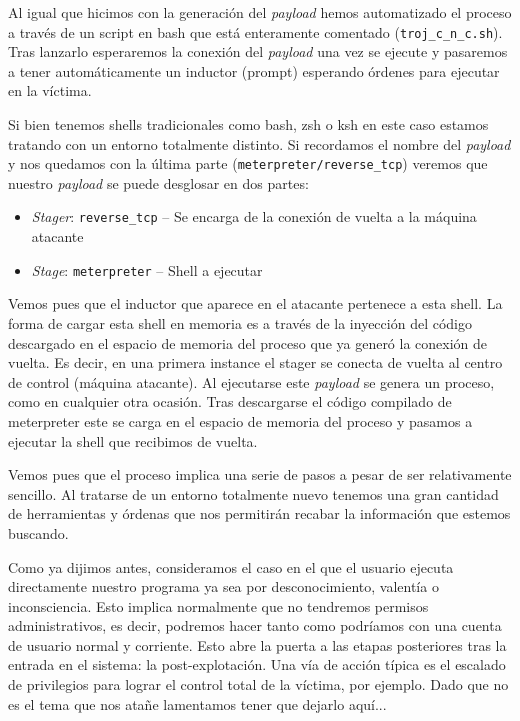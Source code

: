\documentclass[12pt]{article}
\newcommand{\newpar} {
    \vskip 0.5cm
}
\begin{document}
                \newpar

                Al igual que hicimos con la generación del \textit{payload} hemos automatizado el proceso a través de un script en bash que está enteramente comentado (\texttt{troj\_c\_n\_c.sh}). Tras lanzarlo esperaremos la conexión del \textit{payload} una vez se ejecute y pasaremos a tener automáticamente un inductor (prompt) esperando órdenes para ejecutar en la víctima.

                \newpar

                Si bien tenemos shells tradicionales como bash, zsh o ksh en este caso estamos tratando con un entorno totalmente distinto. Si recordamos el nombre del \textit{payload} y nos quedamos con la última parte (\texttt{meterpreter/reverse\_tcp}) veremos que nuestro \textit{payload} se puede desglosar en dos partes:

                \begin{itemize}
                    \item \textit{Stager}: \texttt{reverse\_tcp} -- Se encarga de la conexión de vuelta a la máquina atacante
                    \item \textit{Stage}: \texttt{meterpreter} -- Shell a ejecutar
                \end{itemize}

                Vemos pues que el inductor que aparece en el atacante pertenece a esta shell. La forma de cargar esta shell en memoria es a través de la inyección del código descargado en el espacio de memoria del proceso que ya generó la conexión de vuelta. Es decir, en una primera instance el stager se conecta de vuelta al centro de control (máquina atacante). Al ejecutarse este \textit{payload} se genera un proceso, como en cualquier otra ocasión. Tras descargarse el código compilado de meterpreter este se carga en el espacio de memoria del proceso y pasamos a ejecutar la shell que recibimos de vuelta.

                \newpar

                Vemos pues que el proceso implica una serie de pasos a pesar de ser relativamente sencillo. Al tratarse de un entorno totalmente nuevo tenemos una gran cantidad de herramientas y órdenas que nos permitirán recabar la información que estemos buscando.

                \newpar

                Como ya dijimos antes, consideramos el caso en el que el usuario ejecuta directamente nuestro programa ya sea por desconocimiento, valentía o inconsciencia. Esto implica normalmente que no tendremos permisos administrativos, es decir, podremos hacer tanto como podríamos con una cuenta de usuario normal y corriente. Esto abre la puerta a las etapas posteriores tras la entrada en el sistema: la post-explotación. Una vía de acción típica es el escalado de privilegios para lograr el control total de la víctima, por ejemplo. Dado que no es el tema que nos atañe lamentamos tener que dejarlo aquí...
\end{document}
